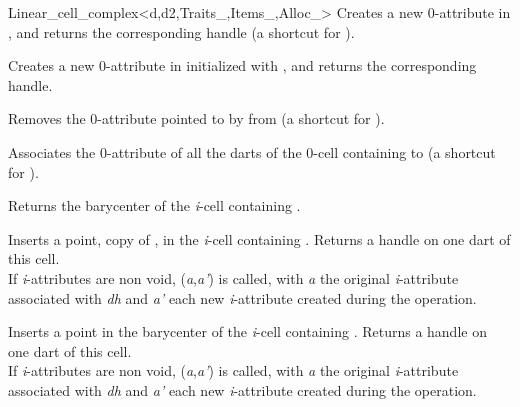 \begin{ccRefClass}{Linear_cell_complex<d,d2,Traits_,Items_,Alloc_>}
{Creates a new 0-attribute in , and returns the corresponding handle
  (a shortcut for ).}

{Creates a new 0-attribute in  initialized with ,
  and returns the corresponding handle.}

{Removes the 0-attribute pointed to by  from 
  (a shortcut for ).
}

{Associates the 0-attribute of all the darts of the 0-cell 
  containing  to 
  (a shortcut for ).
}


{Returns the barycenter of the \emph{i}-cell containing .
}

{Inserts a point, copy of , in the \emph{i}-cell containing .
  Returns a handle on one dart of this cell.  
  \\
    If \emph{i}-attributes are non void, 
    (\emph{a},\emph{a'}) is called, 
    with \emph{a} the original \emph{i}-attribute associated
    with \emph{dh} and \emph{a'} each new \emph{i}-attribute created during the operation.
}

{Inserts a point in the barycenter of the \emph{i}-cell containing .
  Returns a handle on one dart of this cell.  
  \\
    If \emph{i}-attributes are non void, 
    (\emph{a},\emph{a'}) is called,
    with \emph{a} the original \emph{i}-attribute associated
    with \emph{dh} and \emph{a'} each new \emph{i}-attribute created during the operation.
}


\end{ccRefClass}
